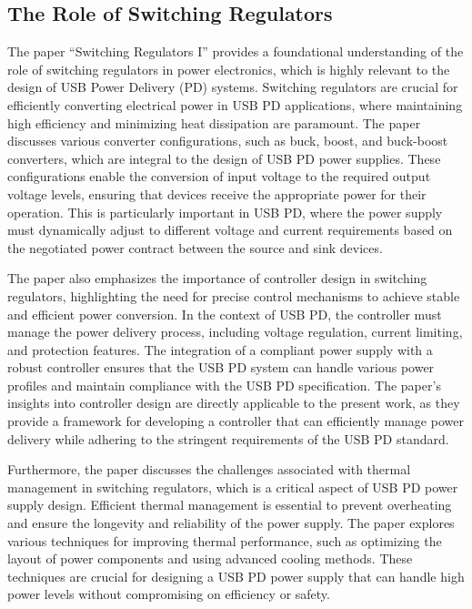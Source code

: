 \subsection{The Role of Switching Regulators}
The paper “Switching Regulators I”\cite{sw_reg} provides a foundational understanding of the role of switching regulators in power electronics, which is highly relevant to the design of USB Power Delivery (PD) systems. Switching regulators are crucial for efficiently converting electrical power in USB PD applications, where maintaining high efficiency and minimizing heat dissipation are paramount. The paper discusses various converter configurations, such as buck, boost, and buck-boost converters, which are integral to the design of USB PD power supplies. These configurations enable the conversion of input voltage to the required output voltage levels, ensuring that devices receive the appropriate power for their operation. This is particularly important in USB PD, where the power supply must dynamically adjust to different voltage and current requirements based on the negotiated power contract between the source and sink devices.

The paper also emphasizes the importance of controller design in switching regulators, highlighting the need for precise control mechanisms to achieve stable and efficient power conversion. In the context of USB PD, the controller must manage the power delivery process, including voltage regulation, current limiting, and protection features. The integration of a compliant power supply with a robust controller ensures that the USB PD system can handle various power profiles and maintain compliance with the USB PD specification. The paper’s insights into controller design are directly applicable to the present work, as they provide a framework for developing a controller that can efficiently manage power delivery while adhering to the stringent requirements of the USB PD standard.

Furthermore, the paper discusses the challenges associated with thermal management in switching regulators, which is a critical aspect of USB PD power supply design. Efficient thermal management is essential to prevent overheating and ensure the longevity and reliability of the power supply. The paper explores various techniques for improving thermal performance, such as optimizing the layout of power components and using advanced cooling methods. These techniques are crucial for designing a USB PD power supply that can handle high power levels without compromising on efficiency or safety\cite{gan_may2024}. 
